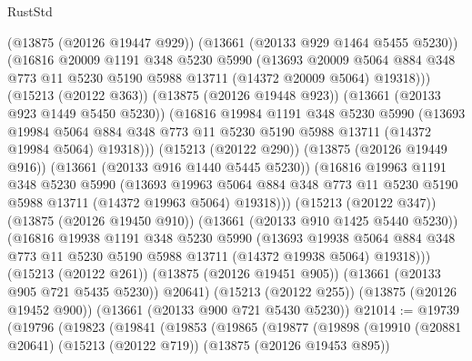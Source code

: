 \begin{lexlean}{RustStd}
\begin{coremodule}
              (@13875 (@20126 @19447 @929))
              (@13661 (@20133 @929 @1464 @5455 @5230))
              (@16816
                @20009
                @1191
                @348
                @5230
                @5990
                (@13693
                  @20009
                  @5064
                  @884
                  @348
                  @773
                  @11
                  @5230
                  @5190
                  @5988
                  @13711
                  (@14372 @20009 @5064)
                  @19318)))
            (@15213 (@20122 @363))
            (@13875 (@20126 @19448 @923))
            (@13661 (@20133 @923 @1449 @5450 @5230))
            (@16816
              @19984
              @1191
              @348
              @5230
              @5990
              (@13693
                @19984
                @5064
                @884
                @348
                @773
                @11
                @5230
                @5190
                @5988
                @13711
                (@14372 @19984 @5064)
                @19318)))
          (@15213 (@20122 @290))
          (@13875 (@20126 @19449 @916))
          (@13661 (@20133 @916 @1440 @5445 @5230))
          (@16816
            @19963
            @1191
            @348
            @5230
            @5990
            (@13693
              @19963
              @5064
              @884
              @348
              @773
              @11
              @5230
              @5190
              @5988
              @13711
              (@14372 @19963 @5064)
              @19318)))
        (@15213 (@20122 @347))
        (@13875 (@20126 @19450 @910))
        (@13661 (@20133 @910 @1425 @5440 @5230))
        (@16816
          @19938
          @1191
          @348
          @5230
          @5990
          (@13693
            @19938
            @5064
            @884
            @348
            @773
            @11
            @5230
            @5190
            @5988
            @13711
            (@14372 @19938 @5064)
            @19318)))
      (@15213 (@20122 @261))
      (@13875 (@20126 @19451 @905))
      (@13661 (@20133 @905 @721 @5435 @5230))
      @20641)
    (@15213 (@20122 @255))
    (@13875 (@20126 @19452 @900))
    (@13661 (@20133 @900 @721 @5430 @5230))
@21014 := @19739
    (@19796
      (@19823
        (@19841
          (@19853
            (@19865
              (@19877
                (@19898
                  (@19910
                    (@20881 @20641)
                    (@15213 (@20122 @719))
                    (@13875 (@20126 @19453 @895))

\end{coremodule}
\end{lexlean}
